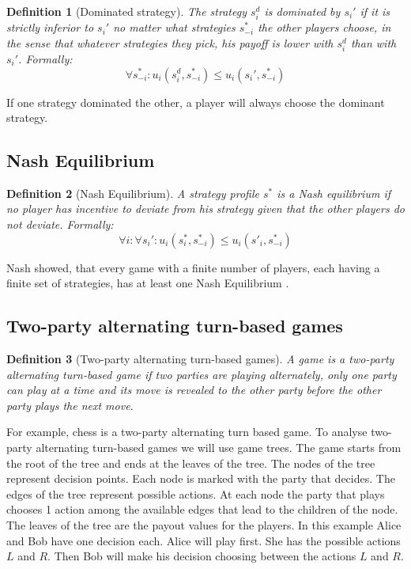 \documentclass{cacthesis}
\newtheorem{definition}{Definition}
\begin{document}
\begin{definition}[Dominated strategy]
The strategy $s^d_i$ is dominated by $s_i'$ if it is strictly inferior to $s_i'$ no matter what strategies $s^*_{-i}$ the other players choose, in the sense that whatever strategies they pick, his payoff is lower with $s^d_i$ than with $s_i'${\normalfont \cite{rasmusen_games_nodate}}. Formally: 
\begin{equation}
    \forall s^*_{-i}: u_i(s^d_i,s^*_{-i}) \leq u_i(s_i',s^*_{-i})
\end{equation}
\end{definition}

If one strategy dominated the other, a player will always choose the dominant strategy.
\subsection{Nash Equilibrium}
\begin{definition}[Nash Equilibrium]
A strategy profile $s^*$ is a Nash equilibrium if no player has incentive to deviate from his strategy given that the other players do not deviate. {\normalfont \cite{rasmusen_games_nodate}} Formally: \begin{equation}
    \forall i: \forall s_i': u_i(s^*_i,s^*_{-i}) \leq u_i(s'_i,s^*_{-i})
\end{equation}
\end{definition}
Nash showed, that every game with a finite number of players, each having a finite set of strategies, has at least one Nash Equilibrium \cite{nash1950}.
\subsection{Two-party alternating turn-based games}
\begin{definition}[Two-party alternating turn-based games]
\label{def:turn-based-game}
A game is a two-party alternating turn-based game if two parties are playing alternately, only one party can play at a time and its move is revealed
to the other party before the other party plays the next move.
\end{definition}
For example, chess is a two-party alternating turn based game. To analyse two-party alternating turn-based games we will use game trees. The game starts from the root of the tree and ends at the leaves of the tree. The nodes of the tree represent decision points. Each node is marked with the party that decides. The edges of the tree represent possible actions. At each node the party that plays chooses 1 action among the available edges that lead to the children of the node. The leaves of the tree are the payout values for the players. In this example Alice and Bob have one decision each. Alice will play first. She has the possible actions $L$ and $R$. Then Bob will make his decision choosing between the actions $L$ and $R$. \newline
\end{document}
